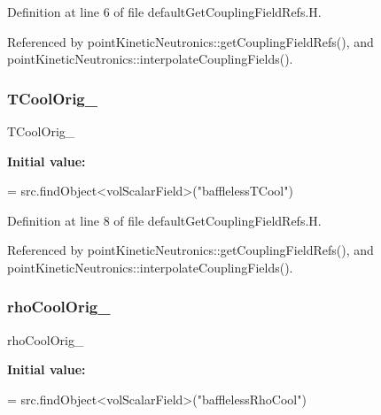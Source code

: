 Definition at line 6 of file default\+Get\+Coupling\+Field\+Refs.\+H.



Referenced by point\+Kinetic\+Neutronics\+::get\+Coupling\+Field\+Refs(), and point\+Kinetic\+Neutronics\+::interpolate\+Coupling\+Fields().

\mbox{\label{defaultGetCouplingFieldRefs_8H_a8b3539e1efe24d56494f4cb35c5b87cb}} 
\subsubsection{\texorpdfstring{T\+Cool\+Orig\+\_\+}{TCoolOrig\_}}
{\footnotesize\ttfamily T\+Cool\+Orig\+\_\+}

{\bfseries Initial value\+:}
\begin{DoxyCode}
= 
    src.findObject<volScalarField>(\textcolor{stringliteral}{"bafflelessTCool"})
\end{DoxyCode}


Definition at line 8 of file default\+Get\+Coupling\+Field\+Refs.\+H.



Referenced by point\+Kinetic\+Neutronics\+::get\+Coupling\+Field\+Refs(), and point\+Kinetic\+Neutronics\+::interpolate\+Coupling\+Fields().

\mbox{\label{defaultGetCouplingFieldRefs_8H_aa1afae7bd76c1676b35d4036c3b50043}} 
\subsubsection{\texorpdfstring{rho\+Cool\+Orig\+\_\+}{rhoCoolOrig\_}}
{\footnotesize\ttfamily rho\+Cool\+Orig\+\_\+}

{\bfseries Initial value\+:}
\begin{DoxyCode}
= 
    src.findObject<volScalarField>(\textcolor{stringliteral}{"bafflelessRhoCool"})
\end{DoxyCode}



